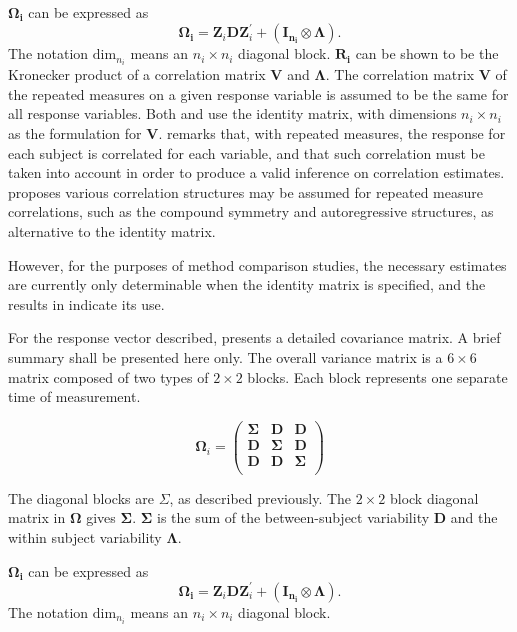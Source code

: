 \documentclass[12pt, a4paper]{report}
\theoremstyle{plain}
\theoremstyle{definition}
\theoremstyle{remark}
\begin{document}
$\boldsymbol{\Omega_{i}}$ can be expressed as
\[
\boldsymbol{\Omega_{i}} = \boldsymbol{Z}_{i}\boldsymbol{D}\boldsymbol{Z}_{i}^\prime + ({\boldsymbol{I_{n_{i}}} \otimes \boldsymbol{\Lambda}}).
\]
The notation $\mbox{dim}_{n_{i}}$ means an $n_{i} \times n_{i}$ diagonal block.
$\boldsymbol{R_{i}}$ can be shown to be the Kronecker product of a correlation matrix $\boldsymbol{V}$ and $\boldsymbol{\Lambda}$. The correlation matrix $\boldsymbol{V}$ of the repeated measures on a given response variable is assumed to be the same for all response variables. Both \citet{hamlett} and \citet{lam} use the identity matrix, with dimensions $n_{i} \times n_{i}$ as the formulation for $\boldsymbol{V}$. \citet{roy} remarks that, with repeated measures, the response for each subject is correlated for each variable, and that such correlation must be taken into account in order to produce a valid inference on correlation estimates.  \citet{roy2006} proposes various correlation structures may be assumed for repeated measure correlations, such as the compound symmetry and autoregressive structures, as alternative to the identity matrix.


However, for the purposes of method comparison studies, the necessary estimates are currently only determinable when the identity matrix is specified, and the results in \citet{roy} indicate its use.

For the response vector described, \citet{hamlett} presents a detailed covariance matrix. A brief summary shall be presented here only. The overall variance matrix is a $6 \times 6$ matrix composed of two types of $2 \times 2$ blocks. Each block represents one separate time of measurement.

\[
\boldsymbol{\Omega}_{i} = \left(
\begin{array}{ccc}
\boldsymbol{\Sigma} & \boldsymbol{D} & \boldsymbol{D}\\
\boldsymbol{D} & \boldsymbol{\Sigma} & \boldsymbol{D}\\
\boldsymbol{D} & \boldsymbol{D} & \boldsymbol{\Sigma}\\
\end{array}\right)
\]

The diagonal blocks are $\Sigma$, as described previously. The $2 \times 2$ block diagonal matrix in $\boldsymbol{\Omega}$ gives $\boldsymbol{\Sigma}$. $\boldsymbol{\Sigma}$ is the sum of the between-subject variability $\boldsymbol{D}$ and the within subject variability $\boldsymbol{\Lambda}$.

$\boldsymbol{\Omega_{i}}$ can be expressed as
\[
\boldsymbol{\Omega_{i}} = \boldsymbol{Z}_{i}\boldsymbol{D}\boldsymbol{Z}_{i}^\prime + ({\boldsymbol{I_{n_{i}}} \otimes \boldsymbol{\Lambda}}).
\]
The notation $\mbox{dim}_{n_{i}}$ means an $n_{i} \times n_{i}$ diagonal block.
\end{document}
